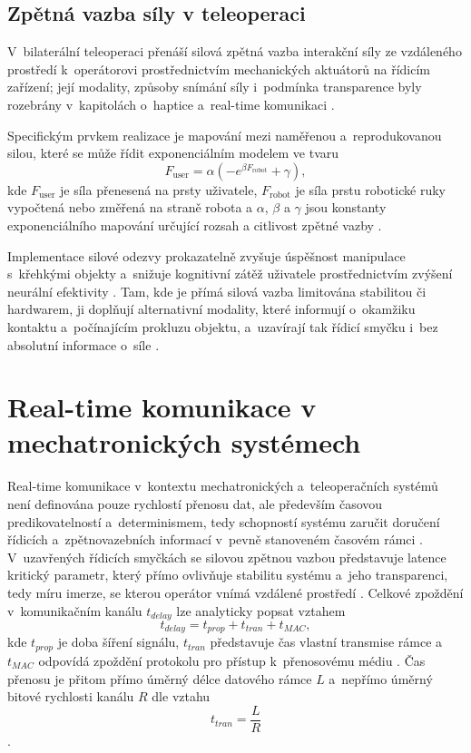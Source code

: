 \documentclass[FZS,DP]{tulthesis}
\begin{document}
\subsection{Zpětná vazba síly v teleoperaci}
V~bilaterální teleoperaci přenáší silová zpětná vazba interakční síly ze vzdáleného prostředí k~operátorovi prostřednictvím mechanických aktuátorů na řídicím zařízení; její modality, způsoby snímání síly i~podmínka transparence byly rozebrány v~kapitolách o~haptice a~real-time komunikaci \cite{GIUDICI2025, Patel2022, Park2022}.

Specifickým prvkem realizace je mapování mezi naměřenou a~reprodukovanou silou, které se může řídit exponenciálním modelem ve tvaru
%
\begin{equation}
    F_{\mathrm{user}} = \alpha\left(-e^{\beta F_{\mathrm{robot}}} + \gamma\right),
\end{equation}
%
kde $F_{\mathrm{user}}$ je síla přenesená na prsty uživatele,
$F_{\mathrm{robot}}$ je síla prstu robotické ruky vypočtená nebo změřená
na straně robota a $\alpha$, $\beta$ a $\gamma$ jsou konstanty
exponenciálního mapování určující rozsah a citlivost zpětné vazby
\cite{Park2022}.

Implementace silové odezvy prokazatelně zvyšuje úspěšnost manipulace s~křehkými objekty a~snižuje kognitivní zátěž uživatele prostřednictvím zvýšení neurální efektivity \cite{Thomas2023110, Park2022, Ninu2014, Chai2022}. Tam, kde je přímá silová vazba limitována stabilitou či hardwarem, ji doplňují alternativní modality, které informují o~okamžiku kontaktu a~počínajícím prokluzu objektu, a~uzavírají tak řídicí smyčku i~bez absolutní informace o~síle \cite{Ninu2014, Chai2022, Mayer2020427}.

\section{Real-time komunikace v mechatronických systémech}
Real-time komunikace v~kontextu mechatronických a~teleoperačních systémů není definována pouze rychlostí přenosu dat, ale především časovou predikovatelností a~determinismem, tedy schopností systému zaručit doručení řídicích a~zpětnovazebních informací v~pevně stanoveném časovém rámci \cite{Aijaz2018, Kos2018, Bolarinwa2022}.
V~uzavřených řídicích smyčkách se silovou zpětnou vazbou představuje latence kritický parametr, který přímo ovlivňuje stabilitu systému a~jeho transparenci, tedy míru imerze, se kterou operátor vnímá vzdálené prostředí \cite{Suman2025, Aijaz2018, Bolarinwa2022, Patel2022, Black2025}.
Celkové zpoždění v~komunikačním kanálu $t_{delay}$ lze analyticky popsat vztahem
%
\begin{equation}
    t_{delay} = t_{prop} + t_{tran} + t_{MAC},
\end{equation}
%
kde $t_{prop}$ je doba šíření signálu, $t_{tran}$ představuje čas vlastní transmise rámce a~$t_{MAC}$ odpovídá zpoždění protokolu pro přístup k~přenosovému médiu \cite{Kos2018}.
Čas přenosu je přitom přímo úměrný délce datového rámce $L$ a~nepřímo úměrný bitové rychlosti kanálu $R$ dle vztahu
%
\begin{equation}
    t_{tran} = \frac{L}{R}
\end{equation}
%
\cite{Kos2018}.
\end{document}
